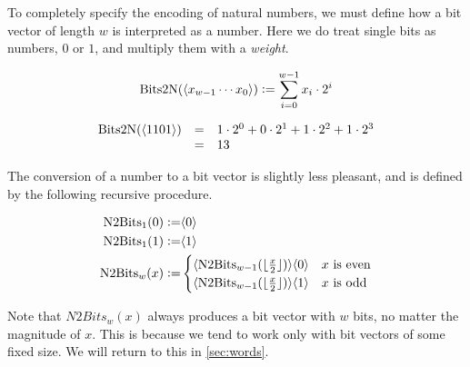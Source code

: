 To completely specify the encoding of natural numbers, we must define
how a bit vector of length $w$ is interpreted as a number.  Here we do
treat single bits as numbers, $0$ or $1$, and multiply them with a
\emph{weight}.

\begin{definition}
\begin{align*}
    \mathrm{Bits2N}(\langle x_{w-1}\cdots x_{0} \rangle) \vcentcolon= \sum_{i=0}^{w-1} x_{i} \cdot{} 2^{i}
\end{align*}
\label{def:bits2n}
\end{definition}

\begin{example}
  \[
    \begin{array}{rcl}
      \mathrm{Bits2N}(\langle 1101 \rangle) & = & 1 \cdot 2^{0} + 0 \cdot 2^{1} + 1 \cdot 2^{2} + 1 \cdot 2^{3} \\
                               & = & 13
    \end{array}
  \]
\end{example}

The conversion of a number to a bit vector is slightly less pleasant,
and is defined by the following recursive procedure.

\begin{definition}
  \begin{align}
    \mathrm{N2Bits}_{1}(0) \vcentcolon= & \langle 0 \rangle \\
    \mathrm{N2Bits}_{1}(1) \vcentcolon= & \langle 1 \rangle \\
    \mathrm{N2Bits}_{w}(x) \vcentcolon= &
                                    \begin{cases}
                                      \langle \mathrm{N2Bits}_{w-1}(\lfloor\frac{x}{2}\rfloor) \rangle\langle 0 \rangle & \textrm{$x$ is even} \\
                                      \langle \mathrm{N2Bits}_{w-1}(\lfloor\frac{x}{2}\rfloor) \rangle\langle 1 \rangle & \textrm{$x$ is odd}
                                    \end{cases}
  \end{align}
  \label{def:n2bits}
\end{definition}

Note that $N2Bits_{w}(x)$ always produces a bit vector with $w$ bits,
no matter the magnitude of $x$.  This is because we tend to work only
with bit vectors of some fixed size. We will return to this in
\cref{sec:words}.

